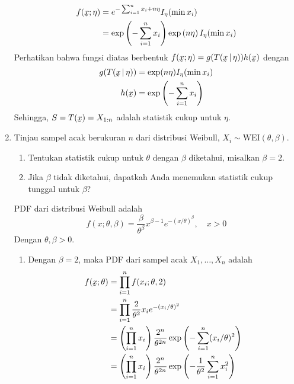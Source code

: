 \documentclass{exam}
\begin{document}
\begin{enumerate}
\begin{solution}
        \begin{align*}
            f(\underaccent{\tilde}{x};\eta)&= e^{-\sum_{i=1}^n x_i + n\eta}I_{\eta}(\min x_i)\\
            &= \exp\left(-\sum_{i=1}^n x_i\right)\exp\left(n\eta\right)I_{\eta}(\min x_i)
        \end{align*}
        Perhatikan bahwa fungsi diatas berbentuk $f(\underaccent{\tilde}{x};\eta) = g(T(\underaccent{\tilde}{x}\,|\,\eta))h(\underaccent{\tilde}{x})$ dengan 
        \begin{align*}
            g(T(\underaccent{\tilde}{x}\,|\,\eta)) &= \exp(n\eta)I_\eta(\min x_i)\\
            h(\underaccent{\tilde}{x}) &= \exp\left(-\sum_{i=1}^n x_i\right)
        \end{align*}
        Sehingga, $S=T(\underaccent{\tilde}{x})=X_{1:n}$ adalah statistik cukup untuk $\eta$.
    \end{solution}
    \item Tinjau sampel acak berukuran \(n\) dari distribusi Weibull, \(X_i \sim \text{WEI}(\theta, \beta)\).
    \begin{enumerate}
        \item Tentukan statistik cukup untuk \(\theta\) dengan \(\beta\) diketahui, misalkan \(\beta = 2\).
        \item Jika \(\beta\) tidak diketahui, dapatkah Anda menemukan statistik cukup tunggal untuk \(\beta\)?
    \end{enumerate}
    \begin{solution}
        PDF dari distribusi Weibull adalah
        \begin{equation*}
            f(x;\theta,\beta) = \frac{\beta}{\theta^\beta}x^{\beta-1}e^{-(x/\theta)^\beta}, \quad x>0
        \end{equation*}
        Dengan $\theta,\beta>0$.
        \begin{enumerate}
            \item Dengan \(\beta=2\), maka PDF dari sampel acak \(X_1,\dots,X_n\) adalah
            \begin{align*}
                f(\underaccent{\tilde}{x};\theta) &= \prod_{i=1}^n f(x_i;\theta,2)\\
                &= \prod_{i=1}^n \frac{2}{\theta^2}x_i e^{-(x_i/\theta)^2}\\
                &= \left(\prod_{i=1}^n x_i\right)\frac{2^n}{\theta^{2n}}\exp\left(-\sum_{i=1}^n(x_i/\theta)^2\right)\\
                &= \left(\prod_{i=1}^n x_i\right)\frac{2^n}{\theta^{2n}}\exp\left(-\frac{1}{\theta^2}\sum_{i=1}^nx_i^2\right)

\end{align*}
\end{enumerate}
\end{solution}
\end{enumerate}
\end{document}
